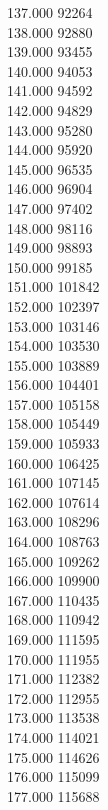 { 137.000	92264 \\
 138.000	92880 \\
 139.000	93455 \\
 140.000	94053 \\
 141.000	94592 \\
 142.000	94829 \\
 143.000	95280 \\
 144.000	95920 \\
 145.000	96535 \\
 146.000	96904 \\
 147.000	97402 \\
 148.000	98116 \\
 149.000	98893 \\
 150.000	99185 \\
 151.000	101842 \\
 152.000	102397 \\
 153.000	103146 \\
 154.000	103530 \\
 155.000	103889 \\
 156.000	104401 \\
 157.000	105158 \\
 158.000	105449 \\
 159.000	105933 \\
 160.000	106425 \\
 161.000	107145 \\
 162.000	107614 \\
 163.000	108296 \\
 164.000	108763 \\
 165.000	109262 \\
 166.000	109900 \\
 167.000	110435 \\
 168.000	110942 \\
 169.000	111595 \\
 170.000	111955 \\
 171.000	112382 \\
 172.000	112955 \\
 173.000	113538 \\
 174.000	114021 \\
 175.000	114626 \\
 176.000	115099 \\
 177.000	115688 \\
}
